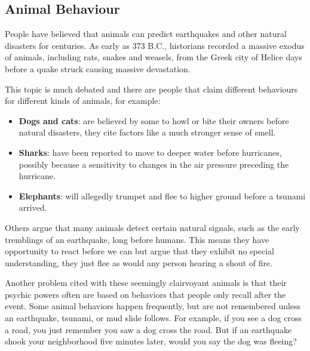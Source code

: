     \label{m38779*eip-745}
            \subsection*{Animal Behaviour}
            \nopagebreak
            \label{m38779*id1164126080746}People have believed that animals can predict earthquakes and other natural disasters for centuries. As early as 373 B.C., historians recorded a massive exodus of animals, including rats, snakes and weasels, from the Greek city of Helice days before a quake struck causing massive devastation.\par 
      \label{m38779*id1164126439136}This topic is much debated and there are people that claim different behaviours for different kinds of animals, for example:\par 
      \label{m38779*id1164132827593}\begin{itemize}[noitemsep]
            \item \textbf{Dogs and cats}: are believed by some to howl or bite their owners before natural disasters, they cite factors like a much stronger sense of smell.\item \textbf{Sharks}: have been reported to move to deeper water before hurricanes, possibly because a sensitivity to changes in the air pressure preceding the hurricane.\item \textbf{Elephants}: will allegedly trumpet and flee to higher ground before a tsunami arrived.\end{itemize}
      \label{m38779*id1164121170251}Others argue that many animals detect certain natural signals, such as the early tremblings of an earthquake, long before humans. This means they have opportunity to react before we can but argue that they exhibit no special understanding, they just flee as would any person hearing a shout of fire.\par 
      \label{m38779*id6489198}Another problem cited with these seemingly clairvoyant animals is that their psychic powers often are based on behaviors that people only recall after the event. Some animal behaviors happen frequently, but are not remembered unless an earthquake, tsunami, or mud slide follows. For example, if you see a dog cross a road, you just remember you saw a dog cross the road. But if an earthquake shook your neighborhood five minutes later, would you say the dog was fleeing? \par 
      \label{m38779*id1553831}
